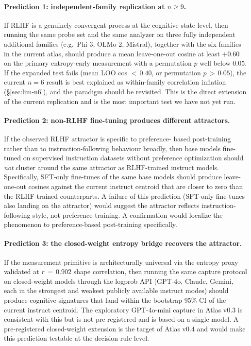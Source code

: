 \documentclass[11pt,letterpaper]{article}
\begin{document}
\paragraph{Prediction 1: independent-family replication at $n\!\geq\!9$.}
If RLHF is a genuinely convergent process at the cognitive-state level,
then running the same probe set and the same analyzer on three fully
independent additional families (e.g.\ Phi-3, OLMo-2, Mistral), together
with the six families in the current atlas, should produce a mean
leave-one-out cosine at least $+0.60$ on the primary entropy-early
measurement with a permutation $p$ well below $0.05$. If the expanded
test fails (mean LOO cos $<\,0.40$, or permutation $p\,>\,0.05$), the
current $n\!=\!6$ result is best explained as within-family correlation
inflation (\S\ref{sec:lim-n6}), and the paradigm should be revisited.
This is the direct extension of the current replication and is the most
important test we have not yet run.

\paragraph{Prediction 2: non-RLHF fine-tuning produces different
attractors.} If the observed RLHF attractor is specific to preference-
based post-training rather than to instruction-following behaviour
broadly, then base models fine-tuned on supervised instruction datasets
without preference optimization should \emph{not} cluster around the
same attractor as RLHF-trained instruct models. Specifically, SFT-only
fine-tunes of the same base models should produce leave-one-out cosines
against the current instruct centroid that are closer to zero than the
RLHF-trained counterparts. A failure of this prediction (SFT-only
fine-tunes also landing on the attractor) would suggest the attractor
reflects instruction-following style, not preference training. A
confirmation would localize the phenomenon to preference-based
post-training specifically.

\paragraph{Prediction 3: the closed-weight entropy bridge recovers the
attractor.} If the measurement primitive is architecturally universal
via the entropy proxy validated at $r\,=\,0.902$ shape correlation, then
running the same capture protocol on closed-weight models through the
logprob API (GPT-4o, Claude, Gemini, each in the strongest and weakest
publicly available instruct modes) should produce cognitive signatures
that land within the bootstrap 95\% CI of the current instruct centroid.
The exploratory GPT-4o-mini capture in Atlas v0.3 is consistent with this
but is not pre-registered and is based on a single model. A pre-registered
closed-weight extension is the target of Atlas v0.4 and would make this
prediction testable at the decision-rule level.
\end{document}
